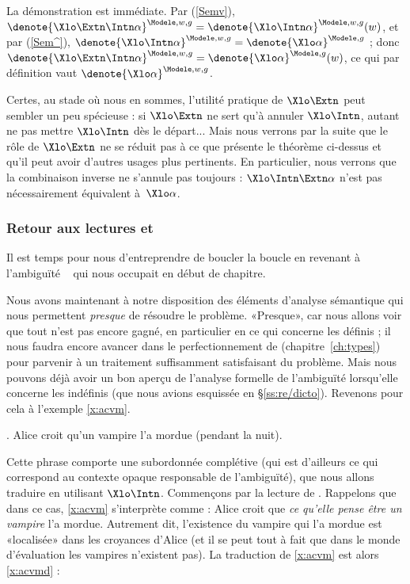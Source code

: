 \sloppy
La démonstration est immédiate. Par (\RSem\ref{Semv}), \(\denote{\Xlo\Extn\Intn\alpha}^{\Modele,w,g}=\denote{\Xlo\Intn\alpha}^{\Modele,w,g}(w)\), 
et par (\RSem\ref{Sem^}), \(\denote{\Xlo\Intn\alpha}^{\Modele,w,g}=\denote{\Xlo\alpha}^{\Modele,g}\) ; donc \(\denote{\Xlo\Extn\Intn\alpha}^{\Modele,w,g}=\denote{\Xlo\alpha}^{\Modele,g}(w)\), ce qui par définition vaut \(\denote{\Xlo\alpha}^{\Modele,w,g}\).

\fussy

Certes, au stade où nous en sommes, l'utilité pratique de $\Xlo\Extn$ peut sembler un peu spécieuse : si $\Xlo\Extn$ ne sert qu'à annuler $\Xlo\Intn$, autant ne pas mettre $\Xlo\Intn$ dès le départ... Mais nous verrons par la suite que le rôle de $\Xlo\Extn$ ne se réduit pas à ce que présente le théorème ci-dessus et qu'il peut avoir d'autres usages plus pertinents. En particulier, nous verrons que la combinaison inverse ne s'annule pas toujours : $\Xlo\Intn\Extn\alpha$ n'est pas nécessairement équivalent à~$\Xlo\alpha$. 




\subsubsection{Retour aux lectures  et }
\label{sss:derededicto}


Il est temps pour nous d'entreprendre de boucler la boucle en revenant à l'ambiguïté  \vs\  qui nous occupait en début de chapitre. 
\largerpage

Nous avons maintenant à notre disposition des éléments d'analyse sémantique qui nous permettent \emph{presque} de résoudre le problème. «Presque», car nous allons voir que tout n'est pas encore gagné, en particulier en ce qui concerne les {\GN} définis ; il nous faudra encore avancer dans le perfectionnement de {\LO} (chapitre~\ref{ch:types}) pour parvenir à un traitement suffisamment satisfaisant du problème.  Mais nous pouvons déjà avoir un bon aperçu de l'analyse formelle de l'ambiguïté lorsqu'elle concerne les {\GN} indéfinis (que nous avions esquissée en \S\ref{ss:re/dicto}).
Revenons pour cela à l'exemple \ref{x:acvm}.

\ex. 
Alice croit qu'un vampire l'a mordue (pendant la nuit).
\label{x:acvm}


Cette phrase comporte une subordonnée complétive (qui est d'ailleurs ce qui correspond au contexte opaque responsable de l'ambiguïté), que nous allons traduire en utilisant {$\Xlo\Intn$}. 
Commençons par la lecture  de . Rappelons que dans ce cas, \ref{x:acvm} s'interprète comme : Alice croit que \emph{ce qu'elle pense être un vampire} l'a mordue. Autrement dit, l'existence du vampire qui l'a mordue est «localisée» dans les croyances d'Alice (et il se peut tout à fait que dans le monde d'évaluation les vampires n'existent pas). La traduction de \ref{x:acvm} est alors \ref{x:acvmd} :

